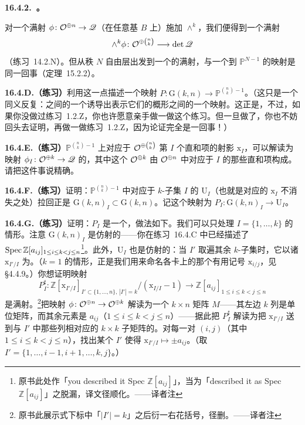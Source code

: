 \textbf{16.4.2.\ \trPluckerEmbedding。}

对一个满射 $\phi\colon\mathcal{O}^{\oplus n}\to\mathscr{Q}$（在任意基 $B$ 上）施加 $\wedge^k$，我们便得到一个满射
\[
\wedge^k\phi\colon\mathcal{O}^{\oplus\binom{n}{k}}\longrightarrow\det\mathscr{Q}
\]
（\mbox{练习~14.2.N}）。但从秩 $N$ 自由层出发到一个\trLineBundle{}的满射，与一个到 $\mathbb{P}^{N-1}$ 的映射是同一回事（\mbox{定理~15.2.2}）。

\textbf{16.4.D.（练习）}\quad 利用这一点描述一个映射 $P\colon\mathrm{G}(k,n)\to\mathbb{P}^{\binom{n}{k}-1}$。（这只是一个同义反复：\trFunctor{}之间的一个\trNaturalTransformation{}诱导出表示它们的概形之间的一个映射。这正是\trYonedaLemma，不过，如果你没做过\mbox{练习~1.2.Z}，你也许愿意亲手做一做这个练习。但一旦做了，你也不妨回头去证明\trYonedaLemma{}，再做一做\mbox{练习~1.2.Z}，因为论证完全是一回事！）

\textbf{16.4.E.（练习）}\quad $\mathbb{P}^{\binom{n}{k}-1}$ 上对应于 $\mathcal{O}^{\oplus\binom{n}{k}}$ 第 $I$ 个直和项的射影\trCoordinate{} $\mathrm{x}_I$，可以解读为映射 $\phi_I\colon\mathcal{O}^{\oplus k}\to\mathscr{Q}$ 的\trDeterminant，其中这个 $\mathcal{O}^{\oplus k}$ 由 $\mathcal{O}^{\oplus n}$ 中对应于 $I$ 的那些直和项构成。请把这件事说精确。

\textbf{16.4.F.（练习）}\quad 证明：$\mathbb{P}^{\binom{n}{k}-1}$ 中对应于 $k$-子集 $I$ 的\trStandardOpenSet{} $\mathrm{U}_I$（也就是对应的\trCoordinate{} $\mathrm{x}_I$ 不消失之处）拉回正是\trOpen\trSubscheme{} $\mathrm{G}(k,n)_I\subset\mathrm{G}(k,n)$。记这个映射为 $P_I\colon\mathrm{G}(k,n)_I\to\mathrm{U}_I$。

\textbf{16.4.G.（练习）}\quad 证明：$P_I$ 是一个\trClosedEmbedding，做法如下。我们可以只处理 $I=\{1,\dots,k\}$ 的情形。注意 $\mathrm{G}(k,n)_I$ 是仿射的——你在\mbox{练习~16.4.C} 中已经描述了 $\operatorname{Spec}\mathbb{Z}[a_{ij}]_{1\le i\le k<j\le n}$\footnote{原书此处作「you described it Spec $\mathbb{Z}[a_{ij}]$」，当为「described it as Spec $\mathbb{Z}[a_{ij}]$」之脱漏，译文径顺化。——译者注}。此外，$\mathrm{U}_I$ 也是仿射的：当 $I'$ 取遍其余 $k$-子集时，它以诸 $\mathrm{x}_{I'/I}$ 为\trCoordinate。（$k=1$ 的情形，正是我们用来命名\trProjectiveSpace{}各卡上\trCoordinate{}的那个有用记号 $\mathrm{x}_{i/j}$，见 \S4.4.9。）你想证明映射
\[
P_I^{\sharp}\colon\mathbb{Z}[\mathrm{x}_{I'/I}]_{I'\subset\{1,\dots,n\},\,|I'|=k}/(\mathrm{x}_{I/I}-1)\longrightarrow\mathbb{Z}[a_{ij}]_{1\le i\le k<j\le n}
\]
是满射。\footnote{原书此展示式下标中「$|I'|=k$」之后衍一右花括号，径删。——译者注}把映射 $\phi\colon\mathcal{O}^{\oplus n}\to\mathcal{O}^{\oplus k}$ 解读为一个 $k\times n$ 矩阵 $M$——其左边 $k$ 列是单位矩阵，而其余元素是 $a_{ij}$（$1\le i\le k<j\le n$）——据此把 $P_I^{\sharp}$ 解读为把 $\mathrm{x}_{I'/I}$ 送到与 $I'$ 中那些列相对应的 $k\times k$ 子矩阵的\trDeterminant。对每一对 $(i,j)$（其中 $1\le i\le k<j\le n$），找出某个 $I'$ 使得 $\mathrm{x}_{I'/I}\mapsto\pm a_{ij}$。（取 $I'=\{1,\dots,i-1,i+1,\dots,k,j\}$。）

